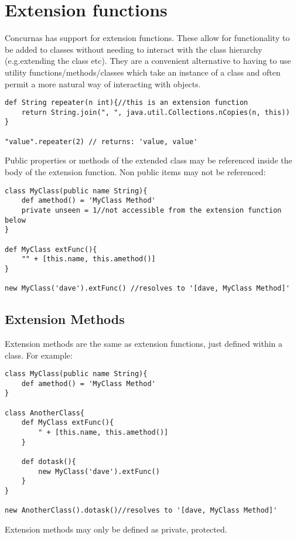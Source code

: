 \documentclass[conc-doc]{subfiles}
\begin{document}
	
	\chapter[Extension functions]{Extension functions}
	\label{ch:extFuncs}
Concurnas has support for extension functions. These allow for functionality to be added to classes without needing to interact with the class hierarchy (e.g.extending the class etc). They are a convenient alternative to having to use utility functions/methods/classes which take an instance of a class and often permit a more natural way of interacting with objects.

\begin{lstlisting}
def String repeater(n int){//this is an extension function
	return String.join(", ", java.util.Collections.nCopies(n, this))
}

"value".repeater(2) // returns: 'value, value'
\end{lstlisting}

Public properties or methods of the extended class may be referenced inside the body of the extension function. Non public items may not be referenced:

\begin{lstlisting}
class MyClass(public name String){
	def amethod() = 'MyClass Method'
	private unseen = 1//not accessible from the extension function below
}

def MyClass extFunc(){
	"" + [this.name, this.amethod()]
}

new MyClass('dave').extFunc() //resolves to '[dave, MyClass Method]'
\end{lstlisting}

\section{Extension Methods}
Extension methods are the same as extension functions, just defined within a class. For example:

\begin{lstlisting}
class MyClass(public name String){
	def amethod() = 'MyClass Method'
}

class AnotherClass{
	def MyClass extFunc(){
		" + [this.name, this.amethod()]
	}
	
	def dotask(){
		new MyClass('dave').extFunc()
	}
}

new AnotherClass().dotask()//resolves to '[dave, MyClass Method]'
\end{lstlisting}

Extension methods may only be defined as private,  protected. 
\end{document}
